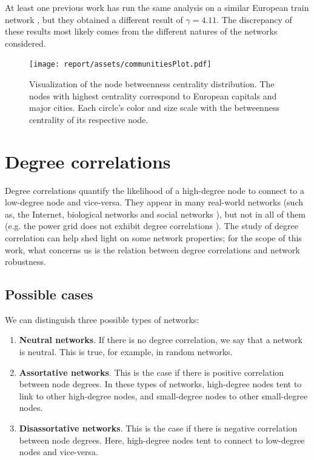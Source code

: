 At least one previous work \cite{gamma4} has run the same analysis on a similar European train network \cite{woodcock}, but they obtained a different result of $\gamma = 4.11$. The discrepancy of these results most likely comes from the different natures of the networks considered.

\begin{figure}
    \centering
    \texttt{[image: report/assets/communitiesPlot.pdf]}
    \caption{    Visualization of the node betweenness centrality distribution. The nodes with highest centrality correspond to European capitals and major cities. Each circle's color and size scale with the betweenness centrality of its respective node.}
    \label{fig:betweenness-plot}
\end{figure}

\section{Degree correlations}
Degree correlations quantify the likelihood of a high-degree node to connect to a low-degree node and vice-versa. They appear in many real-world networks (such as, the Internet, biological networks and social networks \cite{barabasi}), but not in all of them (e.g. the power grid does not exhibit degree correlations \cite{barabasi}). The study of degree correlation can help shed light on some network properties; 
for the scope of this work, what concerns us is the relation between degree correlations and network robustness.

\subsection{Possible cases}
We can distinguish three possible types of networks:
\begin{enumerate}
    \item \textbf{Neutral networks}. If there is no degree correlation, we say that a network is neutral. This is true, for example, in random networks.
    \item \textbf{Assortative networks}. This is the case if there is positive correlation between node degrees. In these types of networks, high-degree nodes tent to link to other high-degree nodes, and small-degree nodes to other small-degree nodes.
    \item \textbf{Disassortative networks}. This is the case if there is negative correlation between node degrees. Here, high-degree nodes tent to connect to low-degree nodes and vice-versa. 
\end{enumerate}

